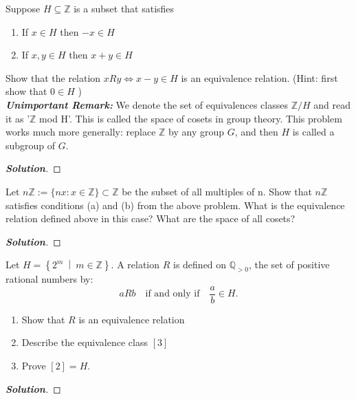\documentclass[11pt]{article}
\newenvironment{problem}[2][Problem\!]{\begin{trivlist}
\item[\hskip \labelsep {\bfseries #1}\hskip \labelsep {\bfseries #2.}]}{\end{trivlist}}
\newenvironment{solution}{\begin{proof}[\textbf{\textit{Solution}}]}{\end{proof}}
\newcommand{\zz}{\mathbb Z}   %
\newcommand{\qq}{\mathbb Q}   %
\newcommand{\setp}[2]{\left\{#1\ \middle|\ #2\right\}} %
\begin{document}
\newpage  %

\begin{problem}{7.2}
Suppose \(H \subseteq \zz\) is a subset that satisfies \begin{enumerate}
        \item [(a)] If \(x \in H\) then \(-x \in H\)
        \item [(b)] If \(x,y \in H\) then \(x+y \in H\)
    \end{enumerate} Show that the relation \(xRy \iff x-y \in H\) is an equivalence relation. (Hint: first show that \(0 \in H\) )\\
    \textbf{\textit{Unimportant Remark:}} We denote the set of equivalences classes \(\zz/H\) and read it as '\(\zz\) mod H'. This is called the space of cosets in group theory. This problem works much more generally: replace \(\zz\) by any group \(G\), and then \(H\) is called a subgroup of \(G\).
\begin{solution}
\end{solution}


\end{problem}

\newpage  %

\begin{problem}{7.3}
Let \(n\zz:= \{nx: x \in \zz\} \subset \zz\) be the subset of all multiples of n. Show that \(n\zz\) satisfies conditions (a) and (b) from the above problem. What is the equivalence relation defined above in this case? What are the space of all cosets?
\begin{solution}
\end{solution}


\end{problem}

\newpage  %

\begin{problem}{7.4}
Let $H = \setp{2^m}{m \in \zz}$. A relation $R$ is defined on $\qq_{>0}$, the set of positive rational numbers by: \[a R b \quad \text{if and only if} \quad \frac{a}{b} \in H.\]
\begin{enumerate}
    \item [(a)] Show that $R$ is an equivalence relation
    \item [(b)] Describe the equivalence class $[3]$
    \item [(c)] Prove $[2] = H$.
\end{enumerate}

\begin{solution}
\end{solution}

\end{problem}
\end{document}
